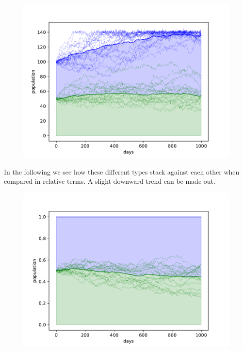 \documentclass[sigconf]{acmart}
\newcommand{\todo}[1]{{\color{red}{#1}}}
\begin{document}
    \begin{figure}
        \includegraphics[width=\columnwidth]{figures/alt_cow_increase_separated}
        \caption{\todo{}}
        \label{fig:alt_cow_separated}
    \end{figure}

    In the following  we see how these different types stack against each other when compared in relative terms.
    A slight downward trend can be made out.


    \begin{figure}
        \includegraphics[width=\columnwidth]{figures/alt_cow_increase_separated_rel}
        \caption{\todo{}}
        \label{fig:alt_cow_separated_rel}
    \end{figure}
\end{document}
